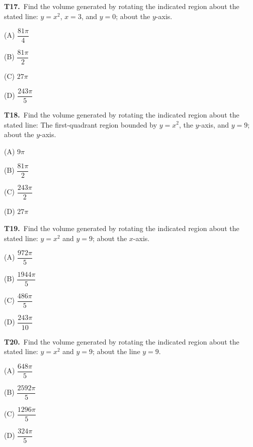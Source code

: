 \documentclass[11pt]{article}
\begin{document}
\bigskip\noindent\textbf{T17.}\ Find the volume generated by rotating the indicated region about the stated line: $y=x^2$, $x=3$, and $y=0$; about the $y$-axis.
\begin{list}{}{\setlength{\leftmargin}{3em}\setlength{\labelwidth}{2.5em}\setlength{\itemsep}{0pt}\setlength{\topsep}{2pt}}
\item[(A)] $\dfrac{81\pi}{4}$
\item[(B)] $\dfrac{81\pi}{2}$
\item[(C)] $27\pi$
\item[(D)] $\dfrac{243\pi}{5}$
\end{list}

\bigskip\noindent\textbf{T18.}\ Find the volume generated by rotating the indicated region about the stated line: The first-quadrant region bounded by $y=x^2$, the $y$-axis, and $y=9$; about the $y$-axis.
\begin{list}{}{\setlength{\leftmargin}{3em}\setlength{\labelwidth}{2.5em}\setlength{\itemsep}{0pt}\setlength{\topsep}{2pt}}
\item[(A)] $9\pi$
\item[(B)] $\dfrac{81\pi}{2}$
\item[(C)] $\dfrac{243\pi}{2}$
\item[(D)] $27\pi$
\end{list}

\bigskip\noindent\textbf{T19.}\ Find the volume generated by rotating the indicated region about the stated line: $y=x^2$ and $y=9$; about the $x$-axis.
\begin{list}{}{\setlength{\leftmargin}{3em}\setlength{\labelwidth}{2.5em}\setlength{\itemsep}{0pt}\setlength{\topsep}{2pt}}
\item[(A)] $\dfrac{972\pi}{5}$
\item[(B)] $\dfrac{1944\pi}{5}$
\item[(C)] $\dfrac{486\pi}{5}$
\item[(D)] $\dfrac{243\pi}{10}$
\end{list}

\bigskip\noindent\textbf{T20.}\ Find the volume generated by rotating the indicated region about the stated line: $y=x^2$ and $y=9$; about the line $y=9$.
\begin{list}{}{\setlength{\leftmargin}{3em}\setlength{\labelwidth}{2.5em}\setlength{\itemsep}{0pt}\setlength{\topsep}{2pt}}
\item[(A)] $\dfrac{648\pi}{5}$
\item[(B)] $\dfrac{2592\pi}{5}$
\item[(C)] $\dfrac{1296\pi}{5}$
\item[(D)] $\dfrac{324\pi}{5}$
\end{list}
\end{document}
